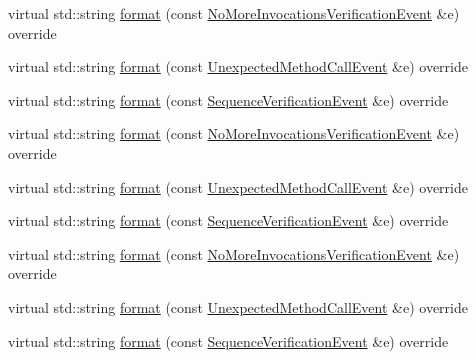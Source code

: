 \begin{DoxyCompactItemize}
virtual std\+::string \mbox{\hyperlink{structfakeit_1_1DefaultEventFormatter_afb224f9544f3a399cd95b57d90f2285b}{format}} (const \mbox{\hyperlink{structfakeit_1_1NoMoreInvocationsVerificationEvent}{No\+More\+Invocations\+Verification\+Event}} \&e) override
\item 
virtual std\+::string \mbox{\hyperlink{structfakeit_1_1DefaultEventFormatter_a8889e692f6ef77c543d07897d659d82b}{format}} (const \mbox{\hyperlink{structfakeit_1_1UnexpectedMethodCallEvent}{Unexpected\+Method\+Call\+Event}} \&e) override
\item 
virtual std\+::string \mbox{\hyperlink{structfakeit_1_1DefaultEventFormatter_a51d3e08835bb3b26ed615b004018a038}{format}} (const \mbox{\hyperlink{structfakeit_1_1SequenceVerificationEvent}{Sequence\+Verification\+Event}} \&e) override
\item 
virtual std\+::string \mbox{\hyperlink{structfakeit_1_1DefaultEventFormatter_afb224f9544f3a399cd95b57d90f2285b}{format}} (const \mbox{\hyperlink{structfakeit_1_1NoMoreInvocationsVerificationEvent}{No\+More\+Invocations\+Verification\+Event}} \&e) override
\item 
virtual std\+::string \mbox{\hyperlink{structfakeit_1_1DefaultEventFormatter_a8889e692f6ef77c543d07897d659d82b}{format}} (const \mbox{\hyperlink{structfakeit_1_1UnexpectedMethodCallEvent}{Unexpected\+Method\+Call\+Event}} \&e) override
\item 
virtual std\+::string \mbox{\hyperlink{structfakeit_1_1DefaultEventFormatter_a51d3e08835bb3b26ed615b004018a038}{format}} (const \mbox{\hyperlink{structfakeit_1_1SequenceVerificationEvent}{Sequence\+Verification\+Event}} \&e) override
\item 
virtual std\+::string \mbox{\hyperlink{structfakeit_1_1DefaultEventFormatter_afb224f9544f3a399cd95b57d90f2285b}{format}} (const \mbox{\hyperlink{structfakeit_1_1NoMoreInvocationsVerificationEvent}{No\+More\+Invocations\+Verification\+Event}} \&e) override
\item 
virtual std\+::string \mbox{\hyperlink{structfakeit_1_1DefaultEventFormatter_a8889e692f6ef77c543d07897d659d82b}{format}} (const \mbox{\hyperlink{structfakeit_1_1UnexpectedMethodCallEvent}{Unexpected\+Method\+Call\+Event}} \&e) override
\item 
virtual std\+::string \mbox{\hyperlink{structfakeit_1_1DefaultEventFormatter_a51d3e08835bb3b26ed615b004018a038}{format}} (const \mbox{\hyperlink{structfakeit_1_1SequenceVerificationEvent}{Sequence\+Verification\+Event}} \&e) override
\item 

\end{DoxyCompactItemize}
